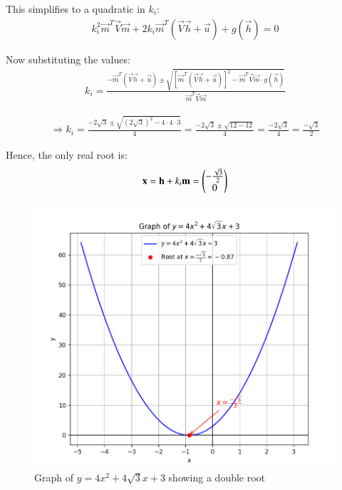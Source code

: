 \documentclass[journal]{IEEEtran}
\begin{document}
This simplifies to a quadratic in \( k_i \):
\begin{align}
k_i^2 \vec{m}^T \vec{V} \vec{m} + 2k_i \vec{m}^T (\vec{V}\vec{h} + \vec{u}) + g(\vec{h}) = 0
\end{align}

Now substituting the values:
\begin{align}
k_i = \frac{ -\vec{m}^T(\vec{V}\vec{h} + \vec{u}) \pm \sqrt{ [\vec{m}^T(\vec{V}\vec{h} + \vec{u})]^2 - \vec{m}^T\vec{V}\vec{m} \cdot g(\vec{h}) } }{\vec{m}^T \vec{V} \vec{m}}
\end{align}

\begin{align}
\Rightarrow k_i = \frac{ -2\sqrt{3} \pm \sqrt{ (2\sqrt{3})^2 - 4 \cdot 4 \cdot 3 } }{4}
= \frac{ -2\sqrt{3} \pm \sqrt{12 - 12} }{4}
= \frac{ -2\sqrt{3} }{4}
= \frac{-\sqrt{3}}{2}
\end{align}

Hence, the only real root is:
\begin{align}
\mathbf{x} = \mathbf{h} + k_i\mathbf{m} = \begin{pmatrix}-\frac{\sqrt{3}}{2} \\ 0\end{pmatrix}
\end{align}

\begin{figure}[h!]
    \centering
    \includegraphics[height=0.5\textheight]{figs/fig.png}
    \caption{Graph of \( y = 4x^2 + 4\sqrt{3}x + 3 \) showing a double root}
    \label{figure_9_4_184}
\end{figure}
\end{document}
